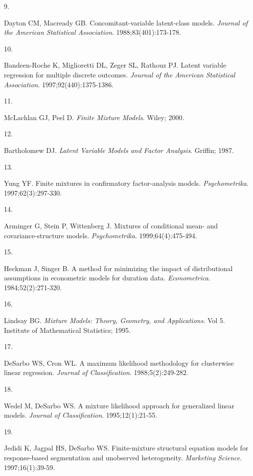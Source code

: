 \documentclass[
  11pt,
]{article}
\newlength{\cslhangindent}
\newlength{\csllabelwidth}
\newenvironment{CSLReferences}[2] %
 {\begin{list}{}{%
  \setlength{\itemindent}{0pt}
  \setlength{\leftmargin}{0pt}
  \setlength{\parsep}{0pt}
  \ifodd #1
   \setlength{\leftmargin}{\cslhangindent}
   \setlength{\itemindent}{-1\cslhangindent}
  \fi
  \setlength{\itemsep}{#2\baselineskip}}}
 {\end{list}}
\newcommand{\CSLLeftMargin}[1]{\parbox[t]{\csllabelwidth}{\strut#1\strut}}
\newcommand{\CSLRightInline}[1]{\parbox[t]{\linewidth - \csllabelwidth}{\strut#1\strut}}
\begin{document}
\begin{CSLReferences}{0}{1}
\CSLLeftMargin{9. }%
\CSLRightInline{Dayton CM, Macready GB. Concomitant-variable latent-class models. \emph{Journal of the American Statistical Association}. 1988;83(401):173-178.}

\CSLLeftMargin{10. }%
\CSLRightInline{Bandeen-Roche K, Miglioretti DL, Zeger SL, Rathouz PJ. Latent variable regression for multiple discrete outcomes. \emph{Journal of the American Statistical Association}. 1997;92(440):1375-1386.}

\CSLLeftMargin{11. }%
\CSLRightInline{McLachlan GJ, Peel D. \emph{Finite Mixture Models}. Wiley; 2000.}

\CSLLeftMargin{12. }%
\CSLRightInline{Bartholomew DJ. \emph{Latent Variable Models and Factor Analysis}. Griffin; 1987.}

\CSLLeftMargin{13. }%
\CSLRightInline{Yung YF. Finite mixtures in confirmatory factor-analysis models. \emph{Psychometrika}. 1997;62(3):297-330.}

\CSLLeftMargin{14. }%
\CSLRightInline{Arminger G, Stein P, Wittenberg J. Mixtures of conditional mean- and covariance-structure models. \emph{Psychometrika}. 1999;64(4):475-494.}

\CSLLeftMargin{15. }%
\CSLRightInline{Heckman J, Singer B. A method for minimizing the impact of distributional assumptions in econometric models for duration data. \emph{Econometrica}. 1984;52(2):271-320.}

\CSLLeftMargin{16. }%
\CSLRightInline{Lindsay BG. \emph{Mixture Models: Theory, Geometry, and Applications}. Vol 5. Institute of Mathematical Statistics; 1995.}

\CSLLeftMargin{17. }%
\CSLRightInline{DeSarbo WS, Cron WL. A maximum likelihood methodology for clusterwise linear regression. \emph{Journal of Classification}. 1988;5(2):249-282.}

\CSLLeftMargin{18. }%
\CSLRightInline{Wedel M, DeSarbo WS. A mixture likelihood approach for generalized linear models. \emph{Journal of Classification}. 1995;12(1):21-55.}

\CSLLeftMargin{19. }%
\CSLRightInline{Jedidi K, Jagpal HS, DeSarbo WS. Finite-mixture structural equation models for response-based segmentation and unobserved heterogeneity. \emph{Marketing Science}. 1997;16(1):39-59.}


\end{CSLReferences}
\end{document}
